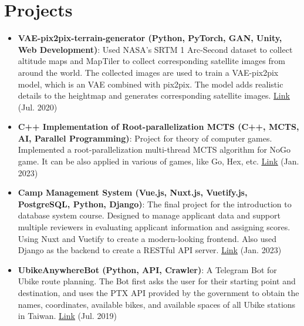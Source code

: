 \documentclass[a4paper,10pt]{extarticle}
\newcommand{\resumeItem}[2]{
  \item\small{
    \textbf{#1}{: #2 \vspace{-2pt}}
  }
}
\newcommand{\resumeSubItem}[2]{\resumeItem{#1}{#2}\vspace{-3pt}}
\newcommand{\resumeSubHeadingListStart}{\begin{itemize}[leftmargin=*]}
\newcommand{\resumeSubHeadingListEnd}{\end{itemize}}
\begin{document}
\vspace{-1.25em}
\section{Projects}
\resumeSubHeadingListStart
\setlength\itemsep{0.25em}
\resumeSubItem{VAE-pix2pix-terrain-generator (Python, PyTorch, GAN, Unity, Web Development)}{Used NASA's SRTM 1 Arc-Second dataset to collect altitude maps and MapTiler to collect corresponding satellite images from around the world. The collected images are used to train a VAE-pix2pix model, which is an VAE combined with pix2pix. The model adds realistic details to the heightmap and generates corresponding satellite images. 
 \href{https://github.com/jayin92/TerrainGAN}{\underline{Link}} (Jul. 2020)}
 \vspace{2pt}
\resumeSubItem{C++ Implementation of Root-parallelization MCTS (C++, MCTS, AI, Parallel Programming)}{Project for theory of computer games. Implemented a root-parallelization multi-thread MCTS algorithm for NoGo game. It can be also applied in various of games, like Go, Hex, etc. \href{https://github.com/jayin92/NYCU-theory-of-computer-games/tree/main/project3/code}{\underline{Link}} (Jan. 2023)}
\resumeSubItem{Camp Management System (Vue.js, Nuxt.js, Vuetify.js, PostgreSQL, Python, Django)}{The final project for the introduction to database system course. Designed to manage applicant data and support multiple reviewers in evaluating applicant information and assigning scores. Using Nuxt and Vuetify to create a modern-looking frontend. Also used Django as the backend to create a RESTful API server. \href{https://github.com/jayin92/camp-management-system}{\underline{Link}} (Jan. 2023)}

\resumeSubItem{UbikeAnywhereBot (Python, API, Crawler)}{A Telegram Bot for Ubike route planning. The Bot first asks the user for their starting point and destination, and uses the PTX API provided by the government to obtain the names, coordinates, available bikes, and available spaces of all Ubike stations in Taiwan. 
 \href{https://github.com/jayin92/UBikeAnywhereBot}{\underline{Link}} (Jul. 2019)}
\resumeSubHeadingListEnd
\end{document}

